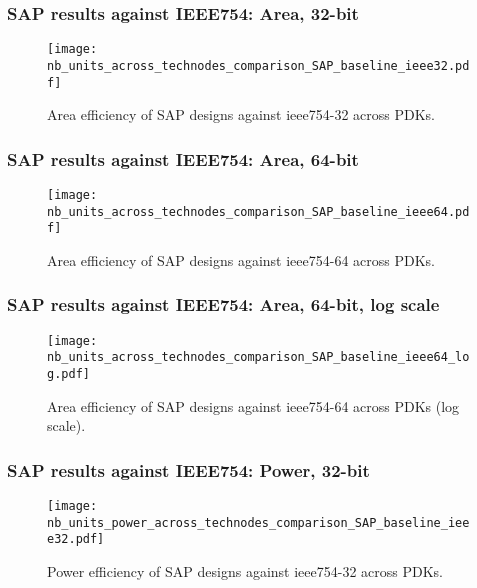 \begin{frame}
    \frametitle{SAP results against IEEE754: Area, 32-bit}

	\begin{figure}[H]
	        \centering
	        \texttt{[image: nb\_units\_across\_technodes\_comparison\_SAP\_baseline\_ieee32.pdf]}
		\caption{Area efficiency of SAP designs against ieee754-32 across PDKs.}
	\end{figure}
\end{frame}

\begin{frame}
    \frametitle{SAP results against IEEE754: Area, 64-bit}

	\begin{figure}[H]
	        \centering
	        \texttt{[image: nb\_units\_across\_technodes\_comparison\_SAP\_baseline\_ieee64.pdf]}
		\caption{Area efficiency of SAP designs against ieee754-64 across PDKs.}
	\end{figure}
\end{frame}

\begin{frame}
	\frametitle{SAP results against IEEE754: Area, 64-bit, log scale}

	\begin{figure}[H]
	        \centering
	        \texttt{[image: nb\_units\_across\_technodes\_comparison\_SAP\_baseline\_ieee64\_log.pdf]}
		\caption{Area efficiency of SAP designs against ieee754-64 across PDKs (log scale).}
	\end{figure}
\end{frame}

\begin{frame}
    \frametitle{SAP results against IEEE754: Power, 32-bit}

	\begin{figure}[H]
	        \centering
	        \texttt{[image: nb\_units\_power\_across\_technodes\_comparison\_SAP\_baseline\_ieee32.pdf]}
		\caption{Power efficiency of SAP designs against ieee754-32 across PDKs.}
	\end{figure}
\end{frame}

